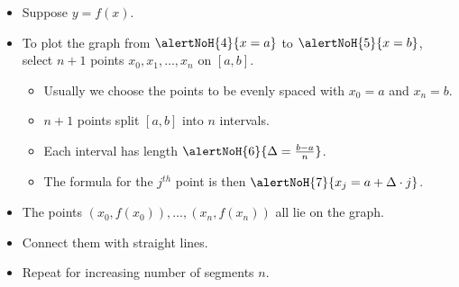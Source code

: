 \begin{frame}
\begin{columns}
\begin{itemize}
\item<2-> Suppose $y=f(x)$. 
\item<4-> To plot the graph from $\alertNoH{4}{x=a}$ to $\alertNoH{5}{x=b}$, select $n+1$ points $x_0, x_1, \dots, x_n$ on $[a,b]$. 
\begin{itemize}
\item<6-> Usually we choose the points to be evenly spaced with $x_0=a$ and $x_n=b$.
\item<7-> $n+1$ points split $[a,b]$ into $n$ intervals. 
\item<8-> Each interval has length $\alertNoH{6}{\Delta=\frac{b-a}{n}}$.
\item<9-> The formula for the $j^{th}$ point is then $\alertNoH{7}{x_j=a+\Delta\cdot j}$.
\end{itemize}
\item<11-> The points $(x_0, f(x_0)), \dots, (x_n, f(x_n))$ all lie on the graph. 
\item<12-> Connect them with straight lines. 
\item<13-> Repeat for increasing number of segments $n$.
\end{itemize}
\end{columns}
\end{frame}